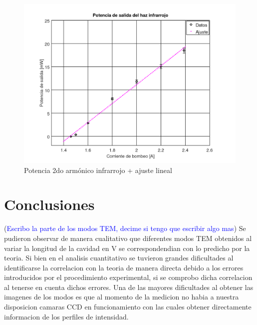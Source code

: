 \documentclass[10pt, a4paper]{article}%
\begin{document}
\begin{multicols}{2}
\begin{figure}[H]
    \centering
    \includegraphics[scale=0.4]{Graficos/pot_infrarrojo.png}
    \caption{Potencia 2do armónico infrarrojo + ajuste lineal}
    \label{potrojo}
\end{figure}



\section{Conclusiones}

(\textcolor{Blue}{Escribo la parte de los modos TEM, decime si tengo que escribir algo mas})
Se pudieron observar de manera cualitativo que diferentes modos TEM obtenidos al variar la longitud de la cavidad en V se correspondendian con lo predicho por la teoria. Si bien en el analisis cuantitativo se tuvieron grandes dificultades al identificarse la correlacion con la teoria de manera directa debido a los errores introducidos por el procedimiento experimental, si se comprobo dicha correlacion al tenerse en cuenta dichos errores. Una de las mayores dificultades al obtener las imagenes de los modos es que al momento de la medicion no habia a nuestra disposicion camaras CCD en funcionamiento con las cuales obtener directamente informacion de los perfiles de intensidad.



\begin{thebibliography}{100}
\end{thebibliography}
\end{multicols}
\end{document}
